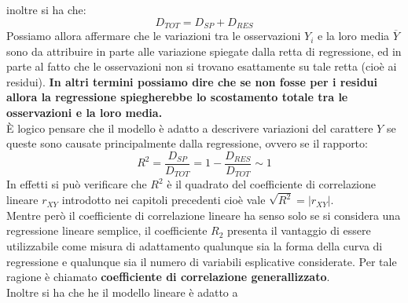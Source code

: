 \documentclass[a4paper,12pt, oneside]{book}
\begin{document}
inoltre si ha che:
\[D_{T O T}=D_{S P}+D_{R E S}\]
Possiamo allora affermare che le variazioni tra le osservazioni $Y_i$ e la loro media $\overline{Y}$ sono da attribuire in parte alle variazione spiegate dalla retta di regressione, ed in
parte al fatto che le osservazioni non si trovano esattamente su tale retta (cioè ai residui). \textbf{In altri termini possiamo dire che se non fosse per i residui allora la regressione
  spiegherebbe lo scostamento totale tra le osservazioni e la loro media.}\\
È logico pensare che il modello è adatto a descrivere variazioni del carattere $Y$ se
queste sono causate principalmente dalla regressione, ovvero se il rapporto:
\[R^{2}=\frac{D_{S P}}{D_{T O T}}=1-\frac{D_{R E S}}{D_{T O T}} \sim 1\]
In effetti si può verificare che
$R^2$ è il quadrato del coefficiente di correlazione lineare $r_{XY}$
introdotto nei capitoli precedenti cioè vale $\sqrt{R^{2}}=\left|r_{X Y}\right|$.\\
Mentre però il coefficiente di correlazione lineare ha senso solo se si considera una
regressione lineare semplice, il coefficiente
$R_2$ presenta il vantaggio di essere utilizzabile
come misura di adattamento qualunque sia la forma della curva di regressione e
qualunque sia il numero di variabili esplicative considerate. Per tale ragione è chiamato \textbf{coefficiente di correlazione generallizzato}.\\
Inoltre si ha che he il modello lineare è adatto a
\end{document}
